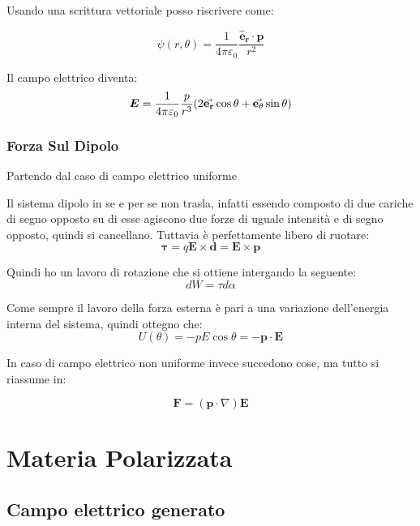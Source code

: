 \documentclass[a4paper]{scrarticle}
\begin{document}
Usando una scrittura vettoriale posso riscrivere come:

\begin{equation}
    \psi(r, \theta) = \frac{1}{4 \pi \varepsilon_0} \frac{\bm{\hat e_r} \cdot \bm p}{r^2}
\end{equation}

Il campo elettrico diventa:
\begin{equation}
    \bm E = \frac{1}{4\pi\varepsilon_0} \frac{p}{r^3} (2 \va{ e_r}\cos \theta + \va{ e_\theta} \sin\theta )
\end{equation}

\subsubsection*{Forza Sul Dipolo}

Partendo dal caso di campo elettrico uniforme

Il sistema dipolo in se e per se non trasla, infatti essendo composto di due cariche di segno opposto su di esse agiscono due forze di uguale intensità e di segno opposto, quindi si cancellano. Tuttavia è perfettamente libero di ruotare:
\begin{equation}
    \bm \tau = q \bm E \times \bm d = \bm E \times \bm p
\end{equation}

Quindi ho un lavoro di rotazione che si ottiene intergando la seguente:
\begin{equation*}
    dW = \tau d\alpha
\end{equation*}

Come sempre il lavoro della forza esterna è pari a una variazione dell'energia interna del sistema, quindi ottegno che:
\begin{equation*}
    U(\theta) = -pE\cos \theta = - \bm p \cdot \bm E
\end{equation*}

In caso di campo elettrico non uniforme invece succedono cose, ma tutto si riassume in:

\begin{equation*}
    \bm F = (\bm p \cdot \nabla)\bm E
\end{equation*}

\section{Materia Polarizzata}

\subsection{Campo elettrico generato}
\end{document}
